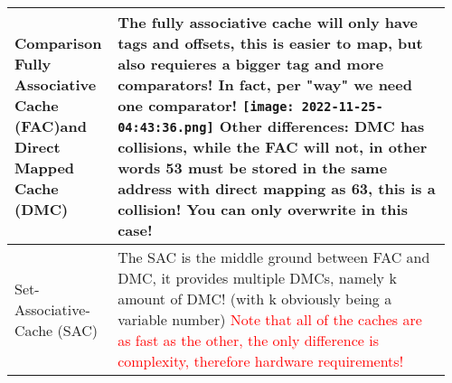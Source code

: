 \documentclass[main.tex,fontsize=8pt,paper=a4,paper=portrait,DIV=calc,]{scrartcl}
\begin{document}
\begin{table}[ht!]
\begin{tabular}{|m{0.2\linewidth}|m{0.755\linewidth}|}
\hline
Comparison Fully Associative Cache (FAC)\newline and Direct Mapped Cache (DMC) & 
The fully associative cache will only have tags and offsets, this is easier to map, but also requieres a bigger tag and more comparators!\newline
\textbf{In fact, per "way" we need one comparator!}\newline
\texttt{[image: 2022-11-25-04:43:36.png]}\newline
Other differences: \newline
DMC has collisions, while the FAC will not, in other words 53 must be stored in the same address with direct mapping as 63, this is a collision! You can only overwrite in this case!
\\
\hline
Set-Associative-Cache (SAC) & 
The SAC is the middle ground between FAC and DMC, it provides multiple DMCs, namely k amount of DMC! (with k obviously being a variable number)\newline
\textcolor{red}{Note that all of the caches are as fast as the other, the only difference is complexity, therefore hardware requirements!}\\
\hline

\hline

\hline

\hline

\hline

\hline

\hline
\end{tabular}
\end{table}
\pagebreak
\end{document}
